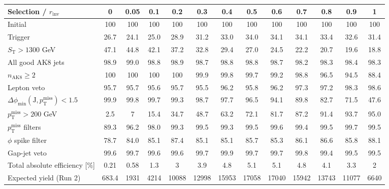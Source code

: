 {\footnotesize\setlength{\tabcolsep}{1.45pt}\renewcommand{\arraystretch}{0.82}%
\begin{tabular}{@{}lcccccccccccc@{}}
\hline
Selection / $r_{\mathrm{inv}}$ & 0 & 0.05 & 0.1 & 0.2 & 0.3 & 0.4 & 0.5 & 0.6 & 0.7 & 0.8 & 0.9 & 1 \\
\hline
Initial & 100 & 100 & 100 & 100 & 100 & 100 & 100 & 100 & 100 & 100 & 100 & 100 \\
Trigger & 26.7 & 24.1 & 25.0 & 28.9 & 31.2 & 33.0 & 34.0 & 34.1 & 34.1 & 33.4 & 32.6 & 31.4 \\
$S_{\mathrm{T}}>1300$ GeV & 47.1 & 44.8 & 42.1 & 37.2 & 32.8 & 29.4 & 27.0 & 24.5 & 22.2 & 20.7 & 19.6 & 18.8 \\
All good AK8 jets & 98.9 & 99.0 & 98.8 & 98.9 & 98.7 & 98.8 & 98.8 & 98.7 & 98.2 & 98.3 & 98.4 & 98.3 \\
$n_{\mathrm{AK8}}\geq 2$ & 100 & 100 & 100 & 100 & 99.9 & 99.8 & 99.7 & 99.2 & 98.8 & 96.5 & 94.5 & 88.4 \\
Lepton veto & 95.7 & 95.7 & 95.6 & 95.7 & 95.5 & 96.2 & 95.8 & 96.2 & 97.3 & 97.2 & 98.3 & 98.6 \\
$\Delta\phi_{\min}(\mathrm{J},p_{\mathrm{T}}^{\mathrm{miss}})<1.5$ & 99.9 & 99.8 & 99.7 & 99.3 & 98.7 & 97.7 & 96.5 & 94.1 & 89.8 & 82.7 & 71.5 & 47.6 \\
$p_{\mathrm{T}}^{\mathrm{miss}}>200$ GeV & 2.5 & 7 & 15.4 & 34.7 & 48.7 & 63.2 & 72.1 & 81.7 & 87.2 & 91.4 & 93.7 & 95.0 \\
$p_{\mathrm{T}}^{\mathrm{miss}}$ filters & 89.3 & 96.2 & 98.0 & 99.3 & 99.5 & 99.3 & 99.5 & 99.6 & 99.4 & 99.5 & 99.7 & 99.5 \\
$\phi$ spike filter & 78.7 & 84.0 & 85.1 & 87.4 & 85.1 & 85.1 & 85.7 & 85.3 & 86.1 & 86.6 & 85.8 & 88.1 \\
Gap-jet veto & 99.6 & 99.7 & 99.6 & 99.6 & 99.7 & 99.9 & 99.7 & 99.7 & 99.8 & 99.4 & 99.5 & 99.5 \\
\hline
Total absolute efficiency [\%] & 0.21 & 0.58 & 1.3 & 3 & 3.9 & 4.8 & 5.1 & 5.1 & 4.8 & 4.1 & 3.3 & 2 \\
\hline
Expected yield (Run 2) & 683.4 & 1931 & 4214 & 10088 & 12998 & 15953 & 17058 & 17040 & 15942 & 13743 & 11077 & 6640 \\
\hline
\end{tabular}%
}
